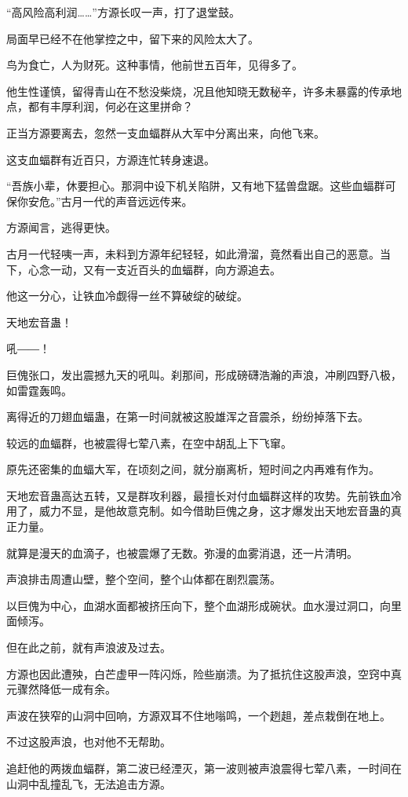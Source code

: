 \begin{this_body}
“高风险高利润……”方源长叹一声，打了退堂鼓。

局面早已经不在他掌控之中，留下来的风险太大了。

鸟为食亡，人为财死。这种事情，他前世五百年，见得多了。

他生性谨慎，留得青山在不愁没柴烧，况且他知晓无数秘辛，许多未暴露的传承地点，都有丰厚利润，何必在这里拼命？

正当方源要离去，忽然一支血蝠群从大军中分离出来，向他飞来。

这支血蝠群有近百只，方源连忙转身速退。

“吾族小辈，休要担心。那洞中设下机关陷阱，又有地下猛兽盘踞。这些血蝠群可保你安危。”古月一代的声音远远传来。

方源闻言，逃得更快。

古月一代轻咦一声，未料到方源年纪轻轻，如此滑溜，竟然看出自己的恶意。当下，心念一动，又有一支近百头的血蝠群，向方源追去。

他这一分心，让铁血冷觑得一丝不算破绽的破绽。

天地宏音蛊！

吼――！

巨傀张口，发出震撼九天的吼叫。刹那间，形成磅礴浩瀚的声浪，冲刷四野八极，如雷霆轰鸣。

离得近的刀翅血蝠蛊，在第一时间就被这股雄浑之音震杀，纷纷掉落下去。

较远的血蝠群，也被震得七荤八素，在空中胡乱上下飞窜。

原先还密集的血蝠大军，在顷刻之间，就分崩离析，短时间之内再难有作为。

天地宏音蛊高达五转，又是群攻利器，最擅长对付血蝠群这样的攻势。先前铁血冷用了，威力不显，是他故意克制。如今借助巨傀之身，这才爆发出天地宏音蛊的真正力量。

就算是漫天的血滴子，也被震爆了无数。弥漫的血雾消退，还一片清明。

声浪排击周遭山壁，整个空间，整个山体都在剧烈震荡。

以巨傀为中心，血湖水面都被挤压向下，整个血湖形成碗状。血水漫过洞口，向里面倾泻。

但在此之前，就有声浪波及过去。

方源也因此遭殃，白芒虚甲一阵闪烁，险些崩溃。为了抵抗住这股声浪，空窍中真元骤然降低一成有余。

声波在狭窄的山洞中回响，方源双耳不住地嗡鸣，一个趔趄，差点栽倒在地上。

不过这股声浪，也对他不无帮助。

追赶他的两拨血蝠群，第二波已经湮灭，第一波则被声浪震得七荤八素，一时间在山洞中乱撞乱飞，无法追击方源。


\end{this_body}
